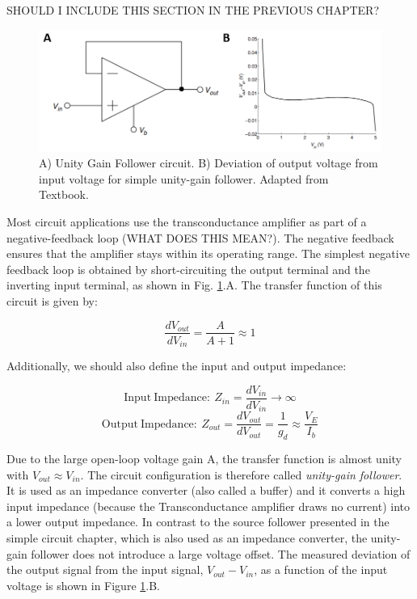 SHOULD I INCLUDE THIS SECTION IN THE PREVIOUS CHAPTER? 

\begin{figure}[H]
    \centering
    \includegraphics[width=0.9\linewidth]{../../Figures/Unity_Gain_Follower.PNG}
    \caption{A) Unity Gain Follower circuit. B) Deviation of output voltage from input voltage for simple unity-gain follower. Adapted from Textbook.}
    \label{fig:Unity_Gain_Follower}
\end{figure}

Most circuit applications use the transconductance amplifier as part of a negative-feedback loop (WHAT DOES THIS MEAN?). The negative feedback ensures that the amplifier stays within its operating range. The simplest negative feedback loop is obtained by short-circuiting the output terminal and the inverting input terminal, as shown in Fig. \ref{fig:Unity_Gain_Follower}.A. The transfer function of this circuit is given by:

\begin{equation}
    \frac{dV_{out}}{dV_{in}} = \frac{A}{A + 1} \approx 1
\end{equation}

Additionally, we should also define the input and output impedance: 

\begin{equation}
    \mathrm{Input \ Impedance: \ } Z_{in} = \frac{dV_{in}}{dV_{in}} \rightarrow \infty
\end{equation}
\begin{equation}
    \mathrm{Output \ Impedance: \ } Z_{out} = \frac{dV_{out}}{dV_{out}} = \frac{1}{g_d} \approx \frac{V_E}{I_b}
\end{equation}

Due to the large open-loop voltage gain A, the transfer function is almost unity with $V_{out} \approx V_{in}$. The circuit configuration is therefore called \textit{unity-gain follower}. It is used as an impedance converter (also called a buffer) and it converts a high input impedance (because the Transconductance amplifier draws no current) into a lower output impedance. In contrast to the source follower presented in the simple circuit chapter, which is also used as an impedance converter, the unity-gain follower does not introduce a large voltage offset. The measured deviation of the output signal from the input signal, $V_{out} - V_{in}$, as a function of the input voltage is shown in Figure \ref{fig:Unity_Gain_Follower}.B.


